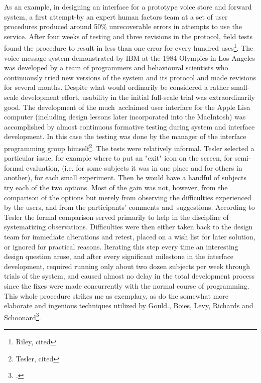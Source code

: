 As an example, in designing an interface for a prototype voice store and forward system, a first attempt-by an expert human factors team at a set of user procedures produced around 50\% unrecoverable errors in attempts to use the service. After four weeks of testing and three revisions in the protocol, field tests found the procedure to result in less than one error for every hundred uses\footnote{Riley, cited\cite{Cox2008}}. The voice message system demonstrated by IBM at the 1984 Olympics in Los Angeles  was developed by a team of programmers and behavioural scientists who continuously tried new versions of the system and its protocol and made revisions for several months.  Despite what would ordinarily be considered a rather small-scale development effort, usability in the initial full-scale trial was extraordinarily good. The development of the much acclaimed user interface for the Apple Lisa computer (including design lessons later incorporated into the MacIntosh) was accomplished by almost continuous formative testing during system and interface development. In this case the testing was done by the manager of the interface programming group himself\footnote{Tesler, cited\cite{Cox2008}}. The tests were relatively informal. Tesler selected a particular issue, for example where to put an "exit" icon on the screen, for semi-formal evaluation, (i.e. for some subjects it was in one place and for others in another), for each small experiment. Then he would have a handful of subjects try each of the two options. Most of the gain was not, however, from the comparison of the options but merely from observing the difficulties experienced by the users, and from the participants' comments and suggestions. According to Tesler the formal comparison served primarily to help in the discipline of systematizing observations. Difficulties were then either taken back to the design team for immediate alterations and retest, placed on a wish list for later solution, or ignored for practical reasons. Iterating this step every time an interesting design question arose, and after every significant milestone in the interface development, required running only about two dozen subjects per week through trials of the system, and caused almost no delay in the total development process since the fixes were made concurrently with the normal course of programming. This whole procedure strikes me as exemplary, as do the somewhat more elaborate and ingenious techniques utilized by Gould., Boies, Levy, Richards and Schoonard\footcite{Cox2008}.

